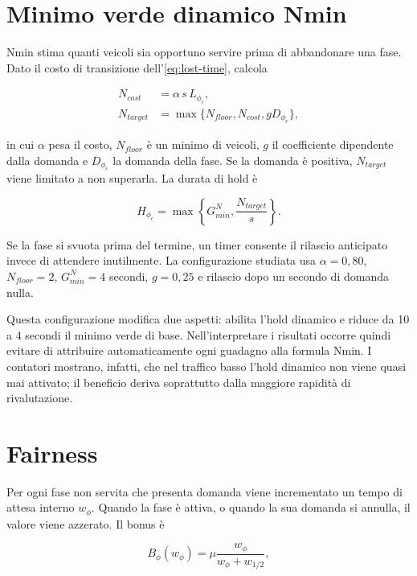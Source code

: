 \documentclass[12pt,a4paper,oneside]{report}
\numberwithin{equation}{chapter}
\begin{document}
\section{Minimo verde dinamico Nmin}

Nmin stima quanti veicoli sia opportuno servire prima di abbandonare una fase.
Dato il costo di transizione dell'\cref{eq:lost-time}, calcola

\begin{align}
    N_{cost} &= \alpha\,s\,L_{\phi_c}, \\
    N_{target} &= \max\{N_{floor},N_{cost},gD_{\phi_c}\},
    \label{eq:nmin-target}
\end{align}

in cui $\alpha$ pesa il costo, $N_{floor}$ è un minimo di veicoli, $g$ il
coefficiente dipendente dalla domanda e $D_{\phi_c}$ la domanda della fase. Se
la domanda è positiva, $N_{target}$ viene limitato a non superarla. La durata
di hold è

\begin{equation}
    H_{\phi_c}=\max\left\{G_{min}^{N},\frac{N_{target}}{s}\right\}.
    \label{eq:nmin-hold}
\end{equation}

Se la fase si svuota prima del termine, un timer consente il rilascio anticipato
invece di attendere inutilmente. La configurazione studiata usa
$\alpha=0{,}80$, $N_{floor}=2$, $G_{min}^{N}=4$ secondi, $g=0{,}25$ e rilascio
dopo un secondo di domanda nulla.

Questa configurazione modifica due aspetti: abilita l'hold dinamico e riduce da
10 a 4 secondi il minimo verde di base. Nell'interpretare i risultati occorre
quindi evitare di attribuire automaticamente ogni guadagno alla formula Nmin.
I contatori mostrano, infatti, che nel traffico basso l'hold dinamico non viene
quasi mai attivato; il beneficio deriva soprattutto dalla maggiore rapidità di
rivalutazione.

\section{Fairness}

Per ogni fase non servita che presenta domanda viene incrementato un tempo di
attesa interno $w_\phi$. Quando la fase è attiva, o quando la sua domanda si
annulla, il valore viene azzerato. Il bonus è

\begin{equation}
    B_\phi(w_\phi)=\mu\frac{w_\phi}{w_\phi+w_{1/2}},
    \label{eq:fairness-bonus}
\end{equation}
\end{document}
